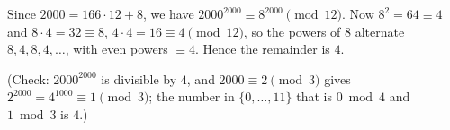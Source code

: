 Since $2000=166\cdot12+8$, we have $2000^{2000}\equiv 8^{2000}\pmod{12}$. Now $8^2=64\equiv4$ and $8\cdot 4=32\equiv 8$, $4\cdot 4=16\equiv 4\pmod{12}$, so the powers of $8$ alternate $8,4,8,4,\dots$, with even powers $\equiv 4$. Hence the remainder is $\boxed{4}$.

(Check: $2000^{2000}$ is divisible by $4$, and $2000\equiv 2\pmod 3$ gives $2^{2000}=4^{1000}\equiv1\pmod 3$; the number in $\{0,\dots,11\}$ that is $0\bmod4$ and $1\bmod 3$ is $4$.)
